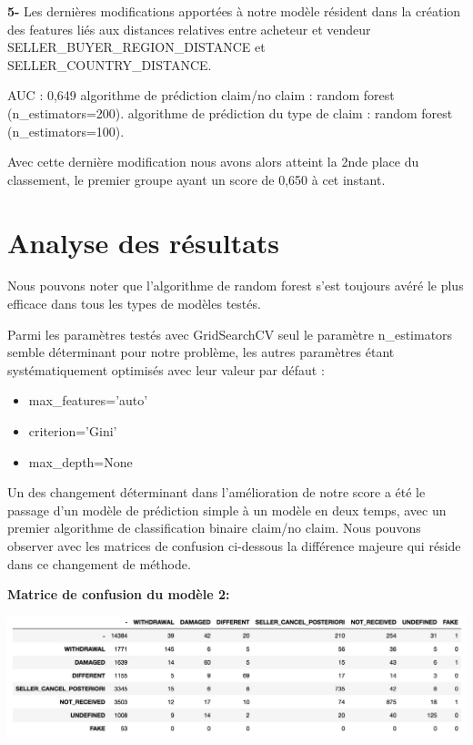 \textbf{5-} Les dernières modifications apportées à notre modèle résident dans la création
des features liés aux distances relatives entre acheteur et vendeur SELLER_BUYER_REGION_DISTANCE 
et SELLER_COUNTRY_DISTANCE. 

AUC : 0,649
algorithme de prédiction claim/no claim : random forest (n_estimators=200).
algorithme de prédiction du type de claim : random forest (n_estimators=100).

Avec cette dernière modification nous avons alors atteint la 2nde place du classement,
le premier groupe ayant un score de 0,650 à cet instant.

\section{Analyse des résultats}

Nous pouvons noter que l'algorithme de random forest s'est toujours avéré le plus efficace
dans tous les types de modèles testés.

Parmi les paramètres testés avec GridSearchCV seul le paramètre n_estimators semble 
déterminant pour notre problème, les autres paramètres étant systématiquement optimisés
avec leur valeur par défaut :

\begin{itemize}
\item max_features='auto'
\item criterion='Gini'
\item max_depth=None
\end{itemize}

Un des changement déterminant dans l'amélioration de notre score a été le passage d'un
modèle de prédiction simple à un modèle en deux temps, avec un premier algorithme
de classification binaire claim/no claim. Nous pouvons observer avec les matrices de confusion
ci-dessous la différence majeure qui réside dans ce changement de méthode.

\vspace{0.5cm}
\textbf{Matrice de confusion du modèle 2:}
\vspace{0.5cm}
\begin{center}
\includegraphics[scale=0.5]{assets/confmat1} 
\end{center}
\vspace{1.5cm}


